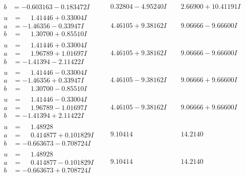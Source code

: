 \documentclass[1p]{elsarticle_modified}
\theoremstyle{definition}
\begin{document}
$$\begin{array}{c|c|c}
\begin{aligned}
b &= -0.603163 - 0.183472 I\end{aligned}
 & \phantom{-}0.32804 - 4.95240 I & \phantom{-}2.66900 + 10.41191 I \\ \hline\begin{aligned}
u &= \phantom{-}1.41446 + 0.33004 I \\
a &= -1.46356 - 0.33947 I \\
b &= \phantom{-}1.30700 + 0.85510 I\end{aligned}
 & \phantom{-}4.46105 + 9.38162 I & \phantom{-}9.06666 - 9.66600 I \\ \hline\begin{aligned}
u &= \phantom{-}1.41446 + 0.33004 I \\
a &= \phantom{-}1.96789 + 1.01697 I \\
b &= -1.41394 - 2.11422 I\end{aligned}
 & \phantom{-}4.46105 + 9.38162 I & \phantom{-}9.06666 - 9.66600 I \\ \hline\begin{aligned}
u &= \phantom{-}1.41446 - 0.33004 I \\
a &= -1.46356 + 0.33947 I \\
b &= \phantom{-}1.30700 - 0.85510 I\end{aligned}
 & \phantom{-}4.46105 - 9.38162 I & \phantom{-}9.06666 + 9.66600 I \\ \hline\begin{aligned}
u &= \phantom{-}1.41446 - 0.33004 I \\
a &= \phantom{-}1.96789 - 1.01697 I \\
b &= -1.41394 + 2.11422 I\end{aligned}
 & \phantom{-}4.46105 - 9.38162 I & \phantom{-}9.06666 + 9.66600 I \\ \hline\begin{aligned}
u &= \phantom{-}1.48928\phantom{ +0.000000I} \\
a &= \phantom{-}0.414877 + 0.101829 I \\
b &= -0.663673 - 0.708724 I\end{aligned}
 & \phantom{-}9.10414\phantom{ +0.000000I} & \phantom{-}14.2140\phantom{ +0.000000I} \\ \hline\begin{aligned}
u &= \phantom{-}1.48928\phantom{ +0.000000I} \\
a &= \phantom{-}0.414877 - 0.101829 I \\
b &= -0.663673 + 0.708724 I\end{aligned}
 & \phantom{-}9.10414\phantom{ +0.000000I} & \phantom{-}14.2140\phantom{ +0.000000I}\\

\end{array}$$
\end{document}
